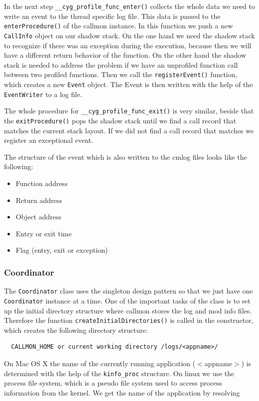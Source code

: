 In the next step \verb=__cyg_profile_func_enter()= collects the whole data we need to write an event to the thread specific log file. This data is passed to the \verb=enterProcedure()= of the callmon instance. In this function we push a new \verb=CallInfo= object on our shadow stack. On the one hand we need the shadow stack to recognize if there was an exception during the execution, because then we will have a different return behavior of the function. On the other hand the shadow stack is needed to address the problem if we have an unprofiled function call between two profiled functions. Then we call the \verb=registerEvent()= function, which creates a new \verb=Event= object. The Event is then written with the help of the \verb=EventWriter= to a log file.

The whole procedure for \verb=__cyg_profile_func_exit()= is very similar, beside that the \verb=exitProcedure()= pops the shadow stack until we find a call record that matches the current stack layout. If we did not find a call record that matches we register an exceptional event.

The structure of the event which is also written to the cmlog files looks like the following:
\begin{itemize}
	\item Function address
	\item Return address
	\item Object address
	\item Entry or exit time
	\item Flag (entry, exit or exception)
\end{itemize}

\subsubsection{Coordinator}

The \verb=Coordinator= class uses the singleton design pattern so that we just have one \verb=Coordinator= instance at a time. One of the important tasks of the class is to set up the initial directory structure where callmon stores the log and mod info files. Therefore the function \verb=createInitialDirectories()= is called in the constructor, which creates the following directory structure:

\begin{verbatim}
  CALLMON_HOME or current working directory /logs/<appname>/
\end{verbatim}

On Mac OS X the name of the currently running application ($<$appname$>$) is determined with the help of the \verb=kinfo_proc= structure. On linux we use the process file system, which is a pseudo file system used to access process information from the kernel. We get the name of the application by resolving 

